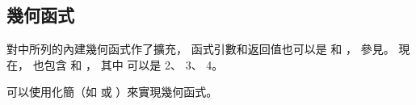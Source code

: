 \subsection[section:geomtricFunc]{幾何函式}

對中所列的內建幾何函式作了擴充，
函式引數和返回值也可以是  和 ，
參見。
現在，  也包含  和 ，
其中  可以是 2、 3、 4。

\startnotepar
可以使用化簡（如  或 ）來實現幾何函式。
\stopnotepar

{}
